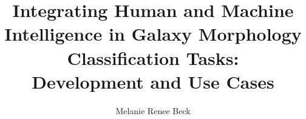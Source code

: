\phd %

\title{\bf Integrating Human and Machine Intelligence in Galaxy Morphology Classification Tasks: \\ Development and Use Cases}
\author{Melanie Renee Beck}


\abstract{}
\copyrightpage %
\acknowledgements{}
\dedication{}


\beforepreface 

\figurespage
\tablespage

\afterpreface            
